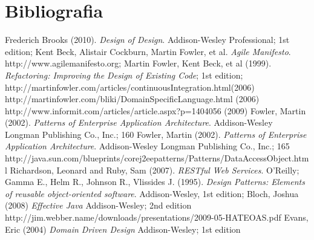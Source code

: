 \section{Bibliografia}

\begin{thebibliography}{12} 

 Frederich Brooks (2010). \textit{Design of Design}. Addison-Wesley Professional; 1st edition;
 Kent Beck, Alistair Cockburn, Martin Fowler, et al. \textit{Agile Manifesto}. http://www.agilemanifesto.org;
 Martin Fowler, Kent Beck, et al (1999). \textit{Refactoring: Improving the Design of Existing Code}; 1st edition;
 http://martinfowler.com/articles/continuousIntegration.html(2006)
 http://martinfowler.com/bliki/DomainSpecificLanguage.html (2006)
 http://www.informit.com/articles/article.aspx?p=1404056 (2009)
 Fowler, Martin (2002). \textit{Patterns of Enterprise Application Architecture}.  Addison-Wesley Longman Publishing Co., Inc.; 160
 Fowler, Martin (2002). \textit{Patterns of Enterprise Application Architecture}.  Addison-Wesley Longman Publishing Co., Inc.; 165
 http://java.sun.com/blueprints/corej2eepatterns/Patterns/DataAccessObject.html
 Richardson, Leonard and Ruby, Sam (2007). \textit{RESTful Web Services}. O'Reilly;
 Gamma E., Helm R., Johnson R., Vlissides J. (1995). \textit{Design Patterns: Elements of reusable object-oriented software}. Addison-Wesley, 1st edition;
 Bloch, Joshua (2008) \textit{Effective Java} Addison-Wesley; 2nd edition
 http://jim.webber.name/downloads/presentations/2009-05-HATEOAS.pdf
 Evans, Eric (2004) \textit{Domain Driven Design} Addison-Wesley; 1st edition 


\end{thebibliography}
